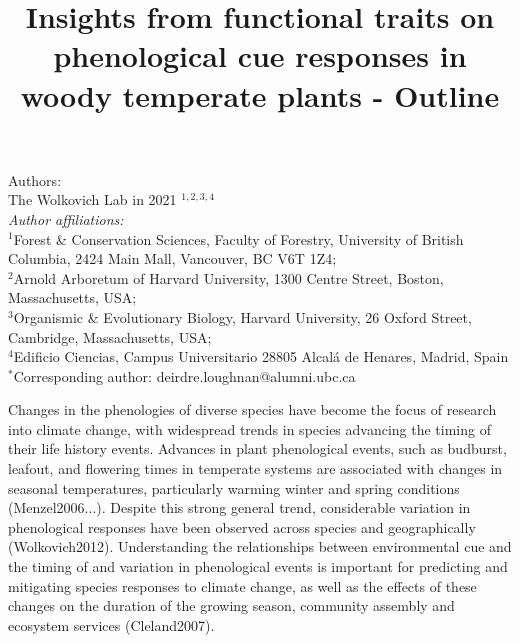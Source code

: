 \documentclass{article}\usepackage[]{graphicx}\usepackage[]{color}
\title{Insights from functional traits on phenological cue responses in woody temperate plants - Outline}
\begin{document}
\maketitle

\noindent Authors:\\
The Wolkovich Lab in 2021 $^{1,2,3,4}$
\vspace{2ex}\\
\emph{Author affiliations:}\\
$^{1}$Forest \& Conservation Sciences, Faculty of Forestry, University of British Columbia, 2424 Main Mall, Vancouver, BC V6T 1Z4;\\
$^{2}$Arnold Arboretum of Harvard University, 1300 Centre Street, Boston, Massachusetts, USA;\\
$^{3}$Organismic \& Evolutionary Biology, Harvard University, 26 Oxford Street, Cambridge, Massachusetts, USA;\\
$^{4}$Edificio Ciencias, Campus Universitario 28805 Alcalá de Henares, Madrid, Spain\\
 

\vspace{2ex}
$^*$Corresponding author: deirdre.loughnan@alumni.ubc.ca\\
\renewcommand{\thetable}{\arabic{table}}
\renewcommand{\thefigure}{\arabic{figure}}
\renewcommand{\labelitemi}{$-$}

Changes in the phenologies of diverse species have become the focus of research into climate change, with widespread trends in species advancing the timing of their life history events. Advances in plant phenological events, such as budburst, leafout, and flowering times in temperate systems are associated with changes in seasonal temperatures, particularly warming winter and spring conditions (Menzel2006...). Despite this strong general trend, considerable variation in phenological responses have been observed across species and geographically (Wolkovich2012). Understanding the relationships between environmental cue and the timing of and variation in phenological events is important for predicting and mitigating species responses to climate change, as well as the effects of these changes on the duration of the growing season, community assembly and ecosystem services (Cleland2007). 
\end{document}
